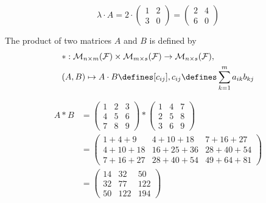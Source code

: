 \begin{exm}
	\begin{equation*}
		\lambda \cdot A = 2 \cdot \begin{pmatrix}
			1 & 2 \\
			3 & 0
		\end{pmatrix} =
		\begin{pmatrix}
			2 & 4 \\
			6 & 0
		\end{pmatrix}
	\end{equation*}
\end{exm}

\begin{definition}\label{def-matrix-multiplication}
	The product of two matrices $A$ and $B$ is defined by
	\begin{align*}
		 & * : \mathcal{M}_{n \times m}(\mathcal{F}) \times
		\mathcal{M}_{m \times s}(\mathcal{F}) \rightarrow
		\mathcal{M}_{n \times s}(\mathcal{F}),                                              \\
		 & (A,B) \mapsto A \cdot B\defines[c_{ij}], c_{ij}\defines\sum_{k=1}^m a_{ik}b_{kj}
	\end{align*}
\end{definition}

\begin{exm}
	\begin{align*}
		A * B & = \begin{pmatrix}
			1 & 2 & 3 \\
			4 & 5 & 6 \\
			7 & 8 & 9
		\end{pmatrix} *
		\begin{pmatrix}
			1 & 4 & 7 \\
			2 & 5 & 8 \\
			3 & 6 & 9
		\end{pmatrix}             \\
		      & = \begin{pmatrix}
			1+4+9   & 4+10+18  & 7+16+27  \\
			4+10+18 & 16+25+36 & 28+40+54 \\
			7+16+27 & 28+40+54 & 49+64+81
		\end{pmatrix}   \\
		      & = \begin{pmatrix}
			14 & 32  & 50  \\
			32 & 77  & 122 \\
			50 & 122 & 194
		\end{pmatrix}
	\end{align*}
\end{exm}

